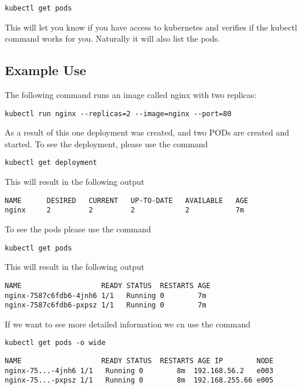 \begin{lstlisting}
kubectl get pods
\end{lstlisting}

This will let you know if you have access to kubernetes and verifies if
the kubectl command works for you. Naturally it will also list the pods.

\subsection{Example Use}

The following command runs an image called nginx with two replicas:

\begin{lstlisting}
kubectl run nginx --replicas=2 --image=nginx --port=80
\end{lstlisting}

As a result of this one deployment was created, and two PODs are created
and started. To see the deployment, please use the command

\begin{lstlisting}
kubectl get deployment
\end{lstlisting}

This will result in the following output

\begin{lstlisting}
NAME      DESIRED   CURRENT   UP-TO-DATE   AVAILABLE   AGE
nginx     2         2         2            2           7m
\end{lstlisting}

To see the pods please use the command

\begin{lstlisting}
kubectl get pods
\end{lstlisting}

This will result in the following output

\begin{lstlisting}
NAME                   READY STATUS  RESTARTS AGE
nginx-7587c6fdb6-4jnh6 1/1   Running 0        7m
nginx-7587c6fdb6-pxpsz 1/1   Running 0        7m
\end{lstlisting}

If we want to see more detailed information we cn use the command

\begin{lstlisting}
kubectl get pods -o wide
\end{lstlisting}

\begin{lstlisting}
NAME                   READY STATUS  RESTARTS AGE IP        NODE
nginx-75...-4jnh6 1/1   Running 0        8m  192.168.56.2   e003
nginx-75...-pxpsz 1/1   Running 0        8m  192.168.255.66 e005
\end{lstlisting}

